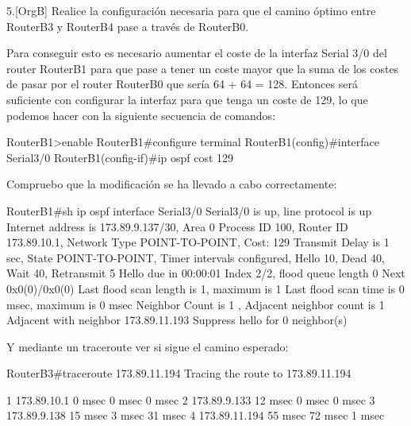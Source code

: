 \begin{ejer}
5.[OrgB]  Realice la configuración necesaria para que el camino óptimo entre RouterB3 y RouterB4 pase a través de RouterB0.
\end{ejer}
\par Para conseguir esto es necesario aumentar el coste de la interfaz Serial 3/0 del router RouterB1 para que pase a tener un coste mayor que la suma de los costes de pasar por el router RouterB0 que sería 64 + 64 = 128.
Entonces será suficiente con configurar la interfaz para que tenga un coste de 129, lo que podemos hacer con la siguiente secuencia de comandos:
\begin{listing}[style=consola]
RouterB1>enable
RouterB1#configure terminal
RouterB1(config)#interface Serial3/0
RouterB1(config-if)#ip ospf cost 129
\end{listing}
\par Compruebo que la modificación se ha llevado a cabo correctamente: \\
\begin{listing}[style=consola]
RouterB1#sh ip ospf interface Serial3/0
Serial3/0 is up, line protocol is up
  Internet address is 173.89.9.137/30, Area 0
  Process ID 100, Router ID 173.89.10.1, Network Type POINT-TO-POINT, Cost: 129
  Transmit Delay is 1 sec, State POINT-TO-POINT,
  Timer intervals configured, Hello 10, Dead 40, Wait 40, Retransmit 5
    Hello due in 00:00:01
  Index 2/2, flood queue length 0
  Next 0x0(0)/0x0(0)
  Last flood scan length is 1, maximum is 1
  Last flood scan time is 0 msec, maximum is 0 msec
  Neighbor Count is 1 , Adjacent neighbor count is 1
    Adjacent with neighbor 173.89.11.193
  Suppress hello for 0 neighbor(s)
\end{listing}
Y mediante un traceroute ver si sigue el camino esperado:
\begin{listing}[style=consola]
RouterB3#traceroute 173.89.11.194
Tracing the route to 173.89.11.194

  1   173.89.10.1     0 msec    0 msec    0 msec    
  2   173.89.9.133    12 msec   0 msec    0 msec    
  3   173.89.9.138    15 msec   3 msec    31 msec   
  4   173.89.11.194   55 msec   72 msec   1 msec
\end{listing}